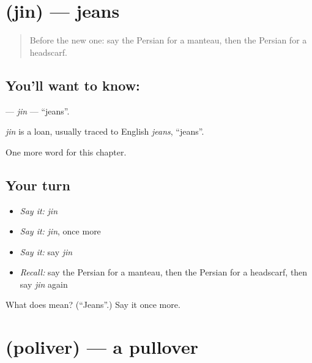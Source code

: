 \section[\texorpdfstring{\fa{جین} (jin)}{جین (jin)}]{ (jin) — jeans}

\label{lesson:FA-C204-jin}



\begin{quote}
Before the new one: say the Persian for a manteau, then the Persian for a headscarf.
\end{quote}

\subsection*{You'll want to know: }
\textbf{} — \emph{jin} — \textquotedblleft{}jeans\textquotedblright{}.

\begin{cousinweb}
\emph{jin} is a loan, usually traced to English \emph{jeans}, \textquotedblleft{}jeans\textquotedblright{}.
\end{cousinweb}

\begin{grammarlens}[title={What you've built}]
One more word for this chapter.
\end{grammarlens}

\subsection*{Your turn}
\begin{itemize}
\raggedright
  \item \emph{Say it:} \emph{jin}
  \item \emph{Say it:} \emph{jin}, once more
  \item \emph{Say it:} say \emph{jin}
  \item \emph{Recall:} say the Persian for a manteau, then the Persian for a headscarf, then say \emph{jin} again
\end{itemize}

\begin{tcolorbox}[breakable,colback=teal!4,colframe=teal!35!black,title={Before you move on}]
What does  mean? (\textquotedblleft{}Jeans\textquotedblright{}.) Say it once more.
\end{tcolorbox}
\section[\texorpdfstring{\fa{پلیور} (poliver)}{پلیور (poliver)}]{ (poliver) — a pullover}

